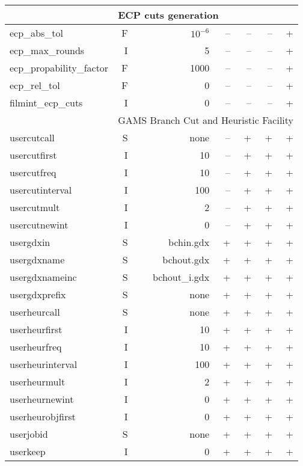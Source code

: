 \begin{center}
\begin{tabular}{|l|r|r|r|r|r|r|}
\hline
\multicolumn{1}{|c}{} & \multicolumn{6}{l|}{ECP cuts generation}\\
\hline
ecp\_abs\_tol& F& $10^{-6}$&--&--&--& +\\
ecp\_max\_rounds& I& 5&--&--&--& +\\
ecp\_propability\_factor& F& 1000&--&--&--& +\\
ecp\_rel\_tol& F& 0&--&--&--& +\\
filmint\_ecp\_cuts& I& 0&--&--&--& +\\
\hline
\multicolumn{1}{|c}{} & \multicolumn{6}{l|}{GAMS Branch Cut and Heuristic Facility}\\
\hline
usercutcall& S& none& --& +& +& +\\
usercutfirst& I& 10& --& +& +& +\\
usercutfreq& I& 10& --& +& +& +\\
usercutinterval& I& 100& --& +& +& +\\
usercutmult& I& 2& --& +& +& +\\
usercutnewint& I& 0& --& +& +& +\\
usergdxin& S& bchin.gdx& +& +& +& +\\
usergdxname& S& bchout.gdx& +& +& +& +\\
usergdxnameinc& S& bchout\_i.gdx& +& +& +& +\\
usergdxprefix& S&none & +& +& +& +\\
userheurcall& S& none& +& +& +& +\\
userheurfirst& I& 10& +& +& +& +\\
userheurfreq& I& 10& +& +& +& +\\
userheurinterval& I& 100& +& +& +& +\\
userheurmult& I& 2& +& +& +& +\\
userheurnewint& I& 0& +& +& +& +\\
userheurobjfirst& I& 0& +& +& +& +\\
userjobid& S& none& +& +& +& +\\
userkeep& I& 0& +& +& +& +\\
\hline
\end{tabular}


\end{center}
